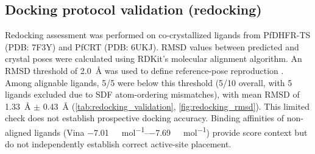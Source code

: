 \documentclass[journal=jcisd8,manuscript=suppinfo]{achemso}
\begin{document}
\subsection*{Docking protocol validation (redocking)}

Redocking assessment was performed on co-crystallized ligands from PfDHFR-TS (PDB: 7F3Y) and PfCRT (PDB: 6UKJ). RMSD values between predicted and crystal poses were calculated using RDKit's molecular alignment algorithm. An RMSD threshold of \qty{2.0}{\angstrom} was used to define reference-pose reproduction \cite{Eberhardt2021}. Among alignable ligands, 5/5 were below this threshold (5/10 overall, with 5 ligands excluded due to SDF atom-ordering mismatches), with mean RMSD of \qty{1.33}{\angstrom} $\pm$ \qty{0.43}{\angstrom} (\cref{tab:redocking_validation}, \cref{fig:redocking_rmsd}). This limited check does not establish prospective docking accuracy. Binding affinities of non-aligned ligands (Vina \qtyrange{-7.01}{-7.69}{\kilo\calorie\per\mole}) provide score context but do not independently establish correct active-site placement.
\end{document}
